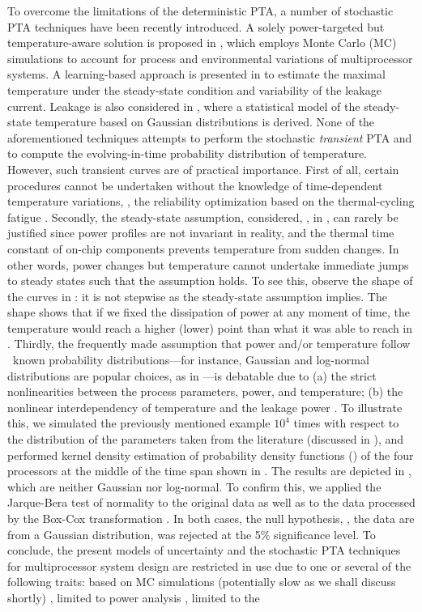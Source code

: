 To overcome the limitations of the deterministic PTA, a number of stochastic PTA techniques have been recently introduced. A solely power-targeted but temperature-aware solution is proposed in \cite{chandra2010}, which employs Monte Carlo (MC) simulations to account for process and environmental variations of multiprocessor systems. A learning-based approach is presented in \cite{juan2011} to estimate the maximal temperature under the steady-state condition and variability of the leakage current. Leakage is also considered in \cite{juan2012}, where a statistical model of the steady-state temperature based on Gaussian distributions is derived. None of the aforementioned techniques attempts to perform the stochastic \emph{transient} PTA and to compute the evolving-in-time probability distribution of temperature. However, such transient curves are of practical importance. First of all, certain procedures cannot be undertaken without the knowledge of time-dependent temperature variations, \eg, the reliability optimization based on the thermal-cycling fatigue \cite{ukhov2012}. Secondly, the steady-state assumption, considered, \eg, in \cite{juan2011, juan2012}, can rarely be justified since power profiles are not invariant in reality, and the thermal time constant of on-chip components prevents temperature from sudden changes. In other words, power changes but temperature cannot undertake immediate jumps to steady states such that the assumption holds. To see this, observe the shape of the curves in : it is not stepwise as the steady-state assumption implies. The shape shows that if we fixed the dissipation of power at any moment of time, the temperature would reach a higher (lower) point than what it was able to reach in . Thirdly, the frequently made assumption that power and/or temperature follow \apriori\ known probability distributions---for instance, Gaussian and log-normal distributions are popular choices, as in \cite{juan2012, srivastava2010}---is debatable due to (a) the strict nonlinearities between the process parameters, power, and temperature; (b) the nonlinear interdependency of temperature and the leakage power \cite{liu2007}. To illustrate this, we simulated the previously mentioned example $10^4$ times with respect to the distribution of the parameters taken from the literature (discussed in ), and performed kernel density estimation of probability density functions (\pdfs) of the four processors at the middle of the time span shown in . The results are depicted in , which are neither Gaussian nor log-normal. To confirm this, we applied the Jarque-Bera test \cite{juan2012} of normality to the original data as well as to the data processed by the Box-Cox transformation \cite{juan2012}. In both cases, the null hypothesis, \ie, the data are from a Gaussian distribution, was rejected at the 5\% significance level. To conclude, the present models of uncertainty and the stochastic PTA techniques for multiprocessor system design are restricted in use due to one or several of the following traits: based on MC simulations (potentially slow as we shall discuss shortly) \cite{chandra2010}, limited to power analysis \cite{chandra2010}, limited to the 